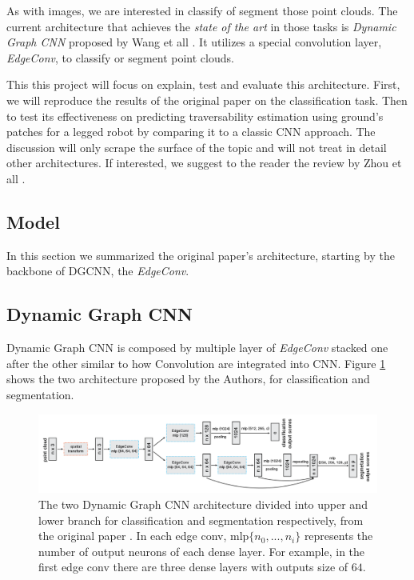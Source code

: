 \documentclass[twocolumn,showpacs,
  nofootinbib,aps,superscriptaddress,
  eqsecnum,prd,notitlepage,showkeys,10pt]{article}
\begin{document}
As with images, we are interested in classify of segment those point clouds. The current architecture that achieves the \emph{state of the art} in those tasks is \emph{Dynamic Graph CNN} proposed by Wang et all \cite{dgcnn}. It utilizes a special convolution layer,  \emph{EdgeConv}, to classify or segment point clouds. 

This this project will focus on explain, test and evaluate this architecture. First, we will reproduce the results of the original paper on the classification task. Then to test its effectiveness on predicting traversability estimation using ground's patches for a legged robot by comparing it to a classic CNN approach. The discussion will only scrape the surface of the topic and will not treat in detail other architectures. If interested, we suggest to the reader the review by Zhou et all \cite{1812.08434}.
\subsection{Model}
In this section we summarized the original paper's architecture, starting by the backbone of DGCNN, the \emph{EdgeConv}.
\subsection{Dynamic Graph CNN}
Dynamic Graph CNN is composed by multiple layer of \emph{EdgeConv} stacked one after the other similar to how Convolution are integrated into CNN. Figure \ref{fig : DGCNN} shows the two architecture proposed by the Authors, for classification and segmentation. 
\begin{figure}
  \centering
  \includegraphics[width=\linewidth]{images/DGCNN.png}
\caption{The two Dynamic Graph CNN architecture divided into upper and lower branch for classification and segmentation respectively, from the original paper \cite{dgcnn}. In each edge conv, mlp$\{n_0, ..., n_{i}\}$ represents the number of output neurons of each dense layer. For example, in the first edge conv there are three dense layers with outputs size of $64$.}
\label{fig : DGCNN}
\end{figure}
\end{document}
